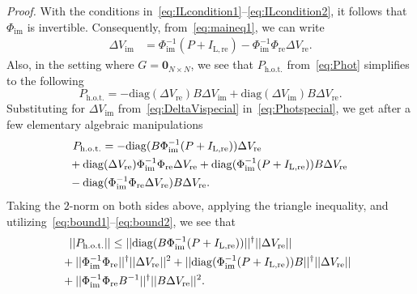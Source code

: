 \documentclass[10 pt, conference]{ieeeconf}
\begin{document}
\noindent \emph{Proof.} With the conditions in~\eqref{eq:ILcondition1}--\eqref{eq:ILcondition2}, it follows that $\Phi_\mathrm{im}$ is invertible. Consequently, from~\eqref{eq:maineq1}, we can write 
\begin{align} \label{eq:DeltaVispecial}
\Delta V_\mathrm{im} &= \Phi_\mathrm{im}^{-1} (P + I_\mathrm{L,re}) - \Phi_\mathrm{im}^{-1} \Phi_\mathrm{re} \Delta V_\mathrm{re}.
\end{align}
Also, in the setting where $G = \mathbf{0}_{N \times N}$, we see that $P_\mathrm{h.o.t.}$ from~\eqref{eq:Phot} simplifies to the following
\begin{equation} \label{eq:Photspecial}
P_\mathrm{h.o.t.} =  -\mathrm{diag}\left(\Delta V_\mathrm{re}\right) B \Delta V_\mathrm{im} +  \mathrm{diag}\left(\Delta V_\mathrm{im}\right) B \Delta V_\mathrm{re}.
\end{equation}
Substituting for $\Delta V_\mathrm{im}$ from~\eqref{eq:DeltaVispecial} in~\eqref{eq:Photspecial}, we get after a few elementary algebraic manipulations
\begin{align} \label{eq:Temp1}
P_\mathrm{h.o.t.} &= -\mathrm{diag}(B\Phi_\mathrm{im}^{-1}(P+I_\mathrm{L,re})) \Delta V_\mathrm{re} \nonumber \\
							  &\hspace{-0.4in}+ \mathrm{diag}(\Delta V_\mathrm{re}) \Phi_\mathrm{im}^{-1}\Phi_\mathrm{re} \Delta V_\mathrm{re} + \mathrm{diag}(\Phi_\mathrm{im}^{-1}(P+I_\mathrm{L,re})) B \Delta V_\mathrm{re} \nonumber \\
							  &\hspace{-0.4in} - \mathrm{diag}(\Phi_\mathrm{im}^{-1}\Phi_\mathrm{re} \Delta V_\mathrm{re}) B \Delta V_\mathrm{re}.
\end{align}
Taking the $2$-norm on both sides above, applying the triangle inequality, and utilizing~\eqref{eq:bound1}--\eqref{eq:bound2}, we see that
\begin{align}
||P_\mathrm{h.o.t.}|| &\leq ||\mathrm{diag}(B\Phi_\mathrm{im}^{-1}(P+I_\mathrm{L,re}))||^\dagger ||\Delta V_\mathrm{re}|| \nonumber \\
&\hspace{-0.6in}+||\Phi_\mathrm{im}^{-1}\Phi_\mathrm{re}||^\dagger ||\Delta V_\mathrm{re}||^2 + ||\mathrm{diag}(\Phi_\mathrm{im}^{-1}(P+I_\mathrm{L,re})) B||^\dagger ||\Delta V_\mathrm{re}|| \nonumber \\
&\hspace{-0.6in}+ ||\Phi_\mathrm{im}^{-1}\Phi_\mathrm{re} B^{-1}||^\dagger ||B \Delta V_\mathrm{re}||^2.
\end{align}
\end{document}

